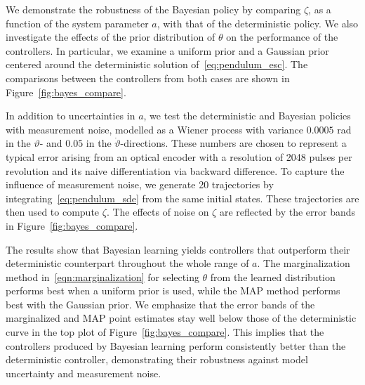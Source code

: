 \begin{enumerate}
    We demonstrate the robustness of the Bayesian policy by comparing $\zeta$,
    as a function of the system parameter $a$, with that of the deterministic
    policy.
    We also investigate the effects of the prior distribution of $\theta$ on the
    performance of the controllers.
    In particular, we examine a uniform prior and a Gaussian prior centered around
    the deterministic solution of~\eqref{eq:pendulum_esc}.
    The comparisons between the controllers from both cases are shown in
    Figure~\ref{fig:bayes_compare}.

    In addition to uncertainties in $a$, we test the deterministic and Bayesian
    policies with measurement noise, modelled as a Wiener process with variance
    $0.0005$ \unit{rad} in the $\vartheta$- and $0.05$  in the
    $\dot{\vartheta}$-directions.
    These numbers are chosen to represent a typical error arising from an
    optical encoder with a resolution of 2048 pulses per revolution and its naive
    differentiation via backward difference.
    To capture the influence of measurement noise, we generate 20 trajectories
    by integrating~\eqref{eq:pendulum_sde} from the same initial states. 
    These trajectories are then used to compute $\zeta$. 
    The effects of noise on $\zeta$ are reflected by the error bands in
    Figure~\ref{fig:bayes_compare}.
\end{enumerate}

The results show that Bayesian learning yields controllers that outperform 
their deterministic counterpart throughout the whole range of $a$.
%
The marginalization method in~\eqref{eqn:marginalization} for selecting $\theta$
from the learned distribution performs best when a uniform prior is used, while
the MAP method performs best with the Gaussian prior.
%
We emphasize that the error bands of the marginalized and MAP point
estimates stay well below those of the deterministic curve in the top plot of
Figure~\ref{fig:bayes_compare}.
%
This implies that the controllers produced by Bayesian learning perform
consistently better than the deterministic controller, demonstrating their
robustness against model uncertainty and measurement noise.


